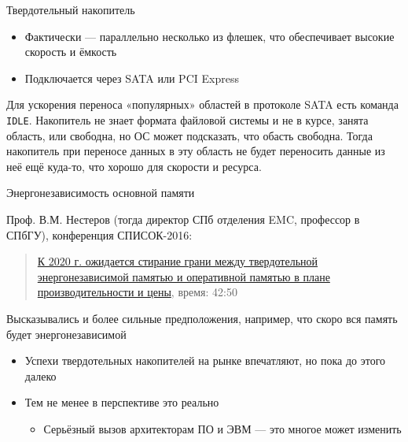 \documentclass[xetex,aspectratio=43]{beamer}
\begin{document}
\begin{frame}[fragile]
    \begin{block}{Твердотельный накопитель}
        \begin{itemize}
            \tightlist
            \item
            Фактически --- параллельно несколько из флешек, что обеспечивает высокие скорость и
            ёмкость
            \item
            Подключается через SATA или PCI Express
        \end{itemize}

        Для ускорения переноса «популярных» областей в протоколе SATA есть
        команда \texttt{IDLE}. Накопитель не знает формата файловой системы и не
        в курсе, занята область, или свободна, но ОС может подсказать, что
        обасть свободна. Тогда накопитель при переносе данных в эту область не
        будет переносить данные из неё ещё куда-то, что хорошо для скорости и
        ресурса.

    \end{block}
\end{frame}

\begin{frame}[fragile]{Энергонезависимость основной памяти}

    Проф. В.М. Нестеров (тогда директор СПб отделения EMC, профессор в
    СПбГУ), конференция СПИСОК-2016:

    \begin{quote}
        \href{http://spisok.math.spbu.ru/video/2016/4.mp4}{К 2020 г. ожидается стирание грани между твердотельной энергонезависимой памятью и оперативной памятью в плане производительности и цены}, время: 42:50
    \end{quote}

    \pause

    Высказывались и более сильные предположения, например, что скоро вся память будет энергонезависимой

    \begin{itemize}
        \tightlist
        \item
        Успехи твердотельных накопителей на рынке впечатляют, но пока до этого далеко
        \item
        Тем не менее в перспективе это реально

        \begin{itemize}
            \tightlist
            \item
            Серьёзный вызов архитекторам ПО и ЭВМ --- это многое может изменить
        \end{itemize}
    \end{itemize}

\end{frame}
\end{document}
